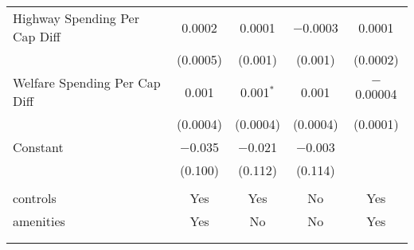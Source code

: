 \begin{table}[!htbp]
\begin{tabular}{@{\extracolsep{5pt}}lcccc}
  Highway Spending Per Cap Diff & 0.0002 & 0.0001 & $-$0.0003 & 0.0001 \\ 
  & (0.0005) & (0.001) & (0.001) & (0.0002) \\ 
  Welfare Spending Per Cap Diff & 0.001 & 0.001$^{*}$ & 0.001 & $-$0.00004 \\ 
  & (0.0004) & (0.0004) & (0.0004) & (0.0001) \\ 
  Constant & $-$0.035 & $-$0.021 & $-$0.003 &  \\ 
  & (0.100) & (0.112) & (0.114) &  \\ 
 \hline \\[-1.8ex] 
controls & Yes & Yes & No & Yes \\ 
amenities & Yes & No & No & Yes \\ 
\hline \\[-1.8ex] 
\hline 
\hline \\[-1.8ex] 
\end{tabular} 
\end{table} 
